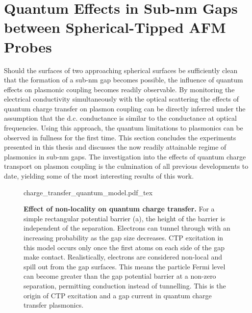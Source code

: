 \documentclass[a4paper]{article}
\begin{document}
\section{Quantum Effects in Sub-nm Gaps between Spherical-Tipped AFM Probes}

Should the surfaces of two approaching spherical surfaces be sufficiently clean that the formation of a sub-nm gap becomes possible, the influence of quantum effects on plasmonic coupling becomes readily observable. By monitoring the electrical conductivity simultaneously with the optical scattering the effects of quantum charge transfer on plasmon coupling can be directly inferred under the assumption that the d.c. conductance is similar to the conductance at optical frequencies. %
Using this approach, the quantum limitations to plasmonics can be observed in fullness for the first time.
This section concludes the experiments presented in this thesis and discusses the now readily attainable regime of plasmonics in sub-nm gaps. The investigation into the effects of quantum charge transport on plasmon coupling is the culmination of all previous developments to date, yielding some of the most interesting results of this work.

\begin{figure}[bt]
\vspace{-5pt}
\def\svgwidth{0.9\textwidth}
\fontsize{10pt}{1em}\selectfont
{charge_transfer_quantum_model.pdf_tex}
\caption[Effect of non-locality on quantum charge transfer]{\textbf{Effect of non-locality on quantum charge transfer.} For a simple rectangular potential barrier (a), the height of the barrier is independent of the separation. Electrons can tunnel through with an increasing probability as the gap size decreases. CTP excitation in this model occurs only once the first atoms on each side of the gap make contact. Realistically, electrons are considered non-local and spill out from the gap surfaces. This means the particle Fermi level can become greater than the gap potential barrier at a non-zero separation, permitting conduction instead of tunnelling. This is the origin of CTP excitation and a gap current in quantum charge transfer plasmonics.}
\label{fig:quantum_charge_transfer_model}
\vspace{-15pt}
\end{figure}
\end{document}
